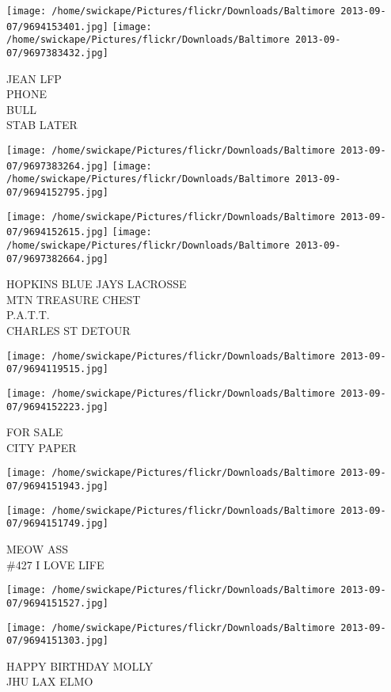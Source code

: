 \documentclass[10pt,letterpaper]{article}
\begin{document}
\texttt{[image: /home/swickape/Pictures/flickr/Downloads/Baltimore 2013-09-07/9694153401.jpg]}
\texttt{[image: /home/swickape/Pictures/flickr/Downloads/Baltimore 2013-09-07/9697383432.jpg]}

JEAN LFP\\
PHONE\\
BULL\\
STAB LATER
\pagebreak

\texttt{[image: /home/swickape/Pictures/flickr/Downloads/Baltimore 2013-09-07/9697383264.jpg]}
\texttt{[image: /home/swickape/Pictures/flickr/Downloads/Baltimore 2013-09-07/9694152795.jpg]}

\texttt{[image: /home/swickape/Pictures/flickr/Downloads/Baltimore 2013-09-07/9694152615.jpg]}
\texttt{[image: /home/swickape/Pictures/flickr/Downloads/Baltimore 2013-09-07/9697382664.jpg]}

HOPKINS BLUE JAYS LACROSSE\\
MTN TREASURE CHEST\\
P.A.T.T.\\
CHARLES ST DETOUR
\pagebreak

\texttt{[image: /home/swickape/Pictures/flickr/Downloads/Baltimore 2013-09-07/9694119515.jpg]}

\vspace{0.25in}
\texttt{[image: /home/swickape/Pictures/flickr/Downloads/Baltimore 2013-09-07/9694152223.jpg]}

FOR SALE\\
CITY PAPER
\pagebreak

\texttt{[image: /home/swickape/Pictures/flickr/Downloads/Baltimore 2013-09-07/9694151943.jpg]}

\vspace{0.25in}
\texttt{[image: /home/swickape/Pictures/flickr/Downloads/Baltimore 2013-09-07/9694151749.jpg]}

MEOW ASS\\
\#427 I LOVE LIFE
\pagebreak

\texttt{[image: /home/swickape/Pictures/flickr/Downloads/Baltimore 2013-09-07/9694151527.jpg]}

\vspace{0.25in}
\texttt{[image: /home/swickape/Pictures/flickr/Downloads/Baltimore 2013-09-07/9694151303.jpg]}

HAPPY BIRTHDAY MOLLY\\
JHU LAX ELMO
\pagebreak
\end{document}
